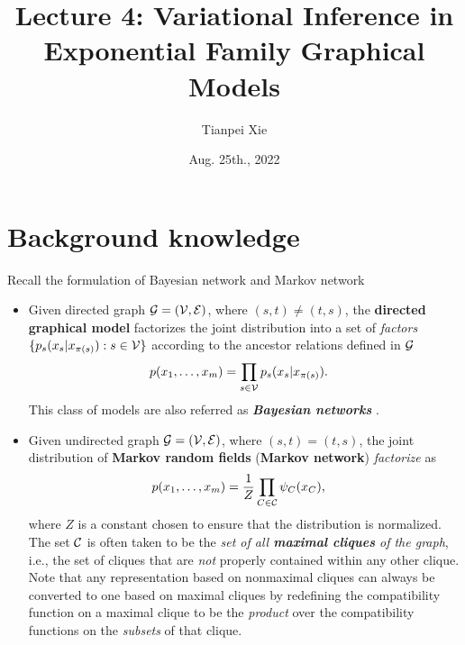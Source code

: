 \documentclass[11pt]{article}
\begin{document}
\title{Lecture 4: Variational Inference in Exponential Family Graphical Models}
\author{ Tianpei Xie}
\date{Aug. 25th., 2022 }
\maketitle
\tableofcontents
\newpage
\allowdisplaybreaks
\section{Background knowledge}
Recall the formulation of Bayesian network and Markov network
\begin{itemize}
\item Given directed graph ${\mathcal G}=({\mathcal V}, {\mathcal E})$, where $(s,t) \neq (t,s)$, the \textbf{directed graphical model}  factorizes the joint distribution into a set of \emph{factors} $\{p_s(x_s | x_{\pi(s)}): s\in {\mathcal V}\}$ according to the ancestor relations defined in ${\mathcal G}$
\begin{align}
p(x_1, \ldots, x_{m}) &= \prod_{s \in {\mathcal V}}p_s(x_s | x_{\pi(s)}). \label{eqn: dag_graph_factorization}
\end{align} This class of models are also referred as \emph{\textbf{Bayesian networks}} \citep{koller2009probabilistic}.


\item Given undirected graph ${\mathcal G}=({\mathcal V}, {\mathcal E})$, where $(s,t) = (t,s)$, the joint distribution of \textbf{Markov random fields} (\textbf{Markov network}) \emph{factorize} as
\begin{align}
p(x_1, \ldots, x_{m}) &= \frac{1}{Z}\prod_{C \in {\mathcal C}}\psi_{C}(x_{C}),\label{eqn: mrf_graph_factorization}
\end{align} where $Z$ is a constant chosen to ensure that the distribution is normalized. The set ${\mathcal C}$ is often taken to be the \emph{set of all \textbf{maximal cliques} of the graph}, i.e., the set of cliques that are \emph{not} properly contained within any other clique. Note that any representation based on nonmaximal cliques can always be converted to one based on maximal cliques by redefining the compatibility function on a maximal clique to be the \emph{product} over the compatibility functions on the \emph{subsets} of that clique.


\end{itemize}
\end{document}
